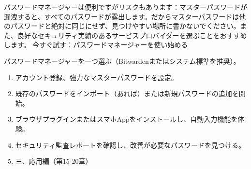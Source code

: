 \begin{tcbwarn}{パスワードマネージャーは便利ですがリスクもあります：マスターパスワードが漏洩すると、すべてのパスワードが露出します。だからマスターパスワードは他のパスワードと絶対に同じにせず、見つけやすい場所に書かないでください。また、良好なセキュリティ実績のあるサービスプロバイダーを選ぶことをおすすめします。}
今すぐ試す：パスワードマネージャーを使い始める

\end{tcbwarn}

\begin{tcbpractice}{パスワードマネージャーを一つ選ぶ（Bitwardenまたはシステム標準を推奨）。}
\begin{enumerate}
  \item アカウント登録、強力なマスターパスワードを設定。
  \item 既存のパスワードをインポート（あれば）または新規パスワードの追加を開始。
  \item ブラウザプラグインまたはスマホAppをインストールし、自動入力機能を体験。
  \item セキュリティ監査レポートを確認し、改善が必要なパスワードを見つける。
  \item 三、応用編（第15-20章）
\end{enumerate}

\end{tcbpractice}
